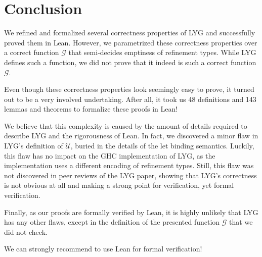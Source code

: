 \chapter{Conclusion}\label{sec:conclusion}

We refined and formalized several correctness properties of LYG and successfully proved them in Lean.
However, we parametrized these correctness properties over a correct function $\mathcal{G}$ that semi-decides emptiness of refinement types.
While LYG defines such a function, we did not prove that it indeed is such a correct function $\mathcal{G}$.

Even though these correctness properties look seemingly easy to prove, it turned out to be a very involved undertaking.
After all, it took us 48 definitions and 143 lemmas and theorems to formalize these proofs in Lean!

We believe that this complexity is caused by the amount of details required to describe LYG and the rigorousness of Lean.
In fact, we discovered a minor flaw in LYG's definition of $\mathcal{U}$, buried in the details of the let binding semantics.
Luckily, this flaw has no impact on the GHC implementation of LYG, as the implementation uses a different encoding of refinement types.
Still, this flaw was not discovered in peer reviews of the LYG paper,
showing that LYG's correctness is not obvious at all and making a strong point for verification, yet formal verification.

Finally, as our proofs are formally verified by Lean, it is highly unlikely that LYG has any other flaws,
except in the definition of the presented function $\mathcal{G}$ that we did not check.

We can strongly recommend to use Lean for formal verification!